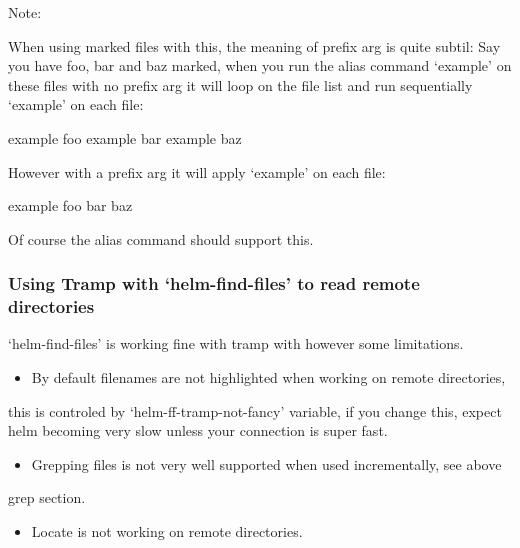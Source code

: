 \documentclass[11pt]{article}
\begin{document}
Note:

When using marked files with this, the meaning of prefix arg is quite
subtil: Say you have foo, bar and baz marked, when you run the alias
command ‘example’ on these files with no prefix arg it will loop on
the file list and run sequentially ‘example’ on each file:

example foo
example bar
example baz

However with a prefix arg it will apply ‘example’ on each file:

example foo bar baz

Of course the alias command should support this.

\subsubsection{Using Tramp with ‘helm-find-files’ to read remote directories}
\label{sec:org81cf4b4}

‘helm-find-files’ is working fine with tramp with however some limitations.

\begin{itemize}
\item By default filenames are not highlighted when working on remote directories,
\end{itemize}
this is controled by ‘helm-ff-tramp-not-fancy’ variable, if you change this,
expect helm becoming very slow unless your connection is super fast.

\begin{itemize}
\item Grepping files is not very well supported when used incrementally, see above
\end{itemize}
grep section.

\begin{itemize}
\item Locate is not working on remote directories.
\end{itemize}
\end{document}
